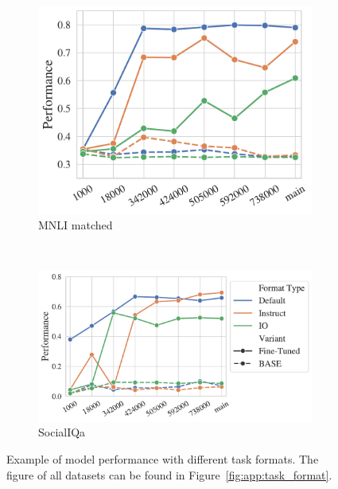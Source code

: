 \begin{figure}[t!]
    \centering
    \begin{subfigure}[b]{0.36\textwidth}
    \includegraphics[width=\the\columnwidth]{figures/fig_files/task_format/task_format_evalmnli_matched-trainmnli.pdf}
        \caption{MNLI matched}
    \end{subfigure}%
    ~
    \begin{subfigure}[b]{0.51\textwidth}
    \includegraphics[width=\the\columnwidth]{figures/fig_files/task_format/task_format_evalsocialiqa-trainsocialiqa.pdf}
        \caption{SocialIQa}
    \end{subfigure}%

    \caption {Example of model performance with different task formats. The figure of all datasets can be found in Figure~\ref{fig:app:task_format}. }
  \label{fig:findings:task_format}
\end{figure}